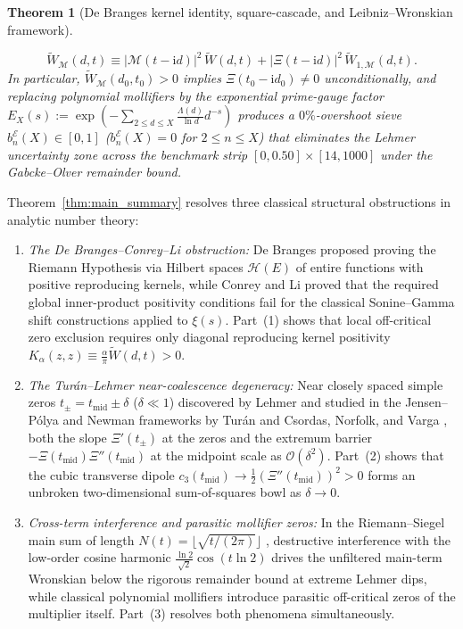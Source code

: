 \documentclass[11pt,reqno,a4paper]{amsart}
\theoremstyle{plain}
\newtheorem{theorem}{Theorem}[section]
\theoremstyle{definition}
\theoremstyle{remark}
\numberwithin{equation}{section}
\newcommand{\ii}{\mathrm{i}}
\begin{document}
\begin{theorem}[De Branges kernel identity, square-cascade, and Leibniz--Wronskian framework]
\begin{enumerate}[label=\textup{(\arabic*)},leftmargin=2.2em]
  \begin{equation}\label{eq:intro_leibniz}
    \widetilde{W}_{\mathcal{M}}(d,t) \equiv \big|\mathcal{M}(t-\ii d)\big|^2\,\widetilde{W}(d,t) + \big|\Xi(t-\ii d)\big|^2\,\widetilde{W}_{1,\mathcal{M}}(d,t).
  \end{equation}
  In particular, $\widetilde{W}_{\mathcal{M}}(d_0,t_0) > 0$ implies $\Xi(t_0 - \ii d_0) \neq 0$ unconditionally, and replacing polynomial mollifiers by the exponential prime-gauge factor $E_X(s) := \exp(-\sum_{2 \le d \le X}\allowbreak\frac{\Lambda(d)}{\ln d}d^{-s})$ produces a $0\%$-overshoot sieve $b_n^{\mathcal{E}}(X) \in [0,1]$ ($b_n^{\mathcal{E}}(X) = 0$ for $2 \le n \le X$) that eliminates the Lehmer uncertainty zone across the benchmark strip $[0,0.50]\times[14,1000]$ under the Gabcke--Olver remainder bound.
\end{enumerate}
\end{theorem}

Theorem~\ref{thm:main_summary} resolves three classical structural obstructions in analytic number theory:
\begin{enumerate}[label=(\roman*),leftmargin=2.2em]
  \item \emph{The De Branges--Conrey--Li obstruction:} De Branges \cite{deBranges1986,deBranges1992} proposed proving the Riemann Hypothesis via Hilbert spaces $\mathcal{H}(E)$ of entire functions with positive reproducing kernels, while Conrey and Li \cite{ConreyLi2000} proved that the required global inner-product positivity conditions fail for the classical Sonine--Gamma shift constructions applied to $\xi(s)$. Part~(1) shows that local off-critical zero exclusion requires only diagonal reproducing kernel positivity $K_\alpha(z,z) \equiv \frac{\alpha}{\pi}\widetilde{W}(d,t) > 0$.
  \item \emph{The Tur\'an--Lehmer near-coalescence degeneracy:} Near closely spaced simple zeros $t_\pm = t_{\mathrm{mid}} \pm \delta$ ($\delta \ll 1$) discovered by Lehmer \cite{Lehmer1956} and studied in the Jensen--P\'olya and Newman frameworks by Tur\'an \cite{Turan1950} and Csordas, Norfolk, and Varga \cite{CsordasNorfolkVarga1986}, both the slope $\Xi'(t_\pm)$ at the zeros and the extremum barrier $-\Xi(t_{\mathrm{mid}})\Xi''(t_{\mathrm{mid}})$ at the midpoint scale as $\mathcal{O}(\delta^2)$. Part~(2) shows that the cubic transverse dipole $c_3(t_{\mathrm{mid}}) \to \frac{1}{2}(\Xi''(t_{\mathrm{mid}}))^2 > 0$ forms an unbroken two-dimensional sum-of-squares bowl as $\delta \to 0$.
  \item \emph{Cross-term interference and parasitic mollifier zeros:} In the Riemann--Siegel main sum of length $N(t) = \lfloor\sqrt{t/(2\pi)}\rfloor$ \cite{Gabcke1979,Olver1974}, destructive interference with the low-order cosine harmonic $\frac{\ln 2}{\sqrt{2}}\cos(t\ln 2)$ drives the unfiltered main-term Wronskian below the rigorous remainder bound at extreme Lehmer dips, while classical polynomial mollifiers \cite{Conrey1989,BuiConreyYoung2011} introduce parasitic off-critical zeros of the multiplier itself. Part~(3) resolves both phenomena simultaneously.
\end{enumerate}
\end{document}
